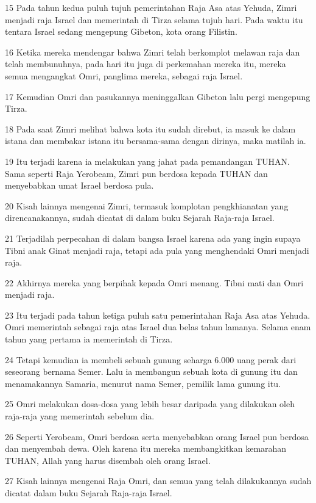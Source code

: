\par 15 Pada tahun kedua puluh tujuh pemerintahan Raja Asa atas Yehuda, Zimri menjadi raja Israel dan memerintah di Tirza selama tujuh hari. Pada waktu itu tentara Israel sedang mengepung Gibeton, kota orang Filistin.
\par 16 Ketika mereka mendengar bahwa Zimri telah berkomplot melawan raja dan telah membunuhnya, pada hari itu juga di perkemahan mereka itu, mereka semua mengangkat Omri, panglima mereka, sebagai raja Israel.
\par 17 Kemudian Omri dan pasukannya meninggalkan Gibeton lalu pergi mengepung Tirza.
\par 18 Pada saat Zimri melihat bahwa kota itu sudah direbut, ia masuk ke dalam istana dan membakar istana itu bersama-sama dengan dirinya, maka matilah ia.
\par 19 Itu terjadi karena ia melakukan yang jahat pada pemandangan TUHAN. Sama seperti Raja Yerobeam, Zimri pun berdosa kepada TUHAN dan menyebabkan umat Israel berdosa pula.
\par 20 Kisah lainnya mengenai Zimri, termasuk komplotan pengkhianatan yang direncanakannya, sudah dicatat di dalam buku Sejarah Raja-raja Israel.
\par 21 Terjadilah perpecahan di dalam bangsa Israel karena ada yang ingin supaya Tibni anak Ginat menjadi raja, tetapi ada pula yang menghendaki Omri menjadi raja.
\par 22 Akhirnya mereka yang berpihak kepada Omri menang. Tibni mati dan Omri menjadi raja.
\par 23 Itu terjadi pada tahun ketiga puluh satu pemerintahan Raja Asa atas Yehuda. Omri memerintah sebagai raja atas Israel dua belas tahun lamanya. Selama enam tahun yang pertama ia memerintah di Tirza.
\par 24 Tetapi kemudian ia membeli sebuah gunung seharga 6.000 uang perak dari seseorang bernama Semer. Lalu ia membangun sebuah kota di gunung itu dan menamakannya Samaria, menurut nama Semer, pemilik lama gunung itu.
\par 25 Omri melakukan dosa-dosa yang lebih besar daripada yang dilakukan oleh raja-raja yang memerintah sebelum dia.
\par 26 Seperti Yerobeam, Omri berdosa serta menyebabkan orang Israel pun berdosa dan menyembah dewa. Oleh karena itu mereka membangkitkan kemarahan TUHAN, Allah yang harus disembah oleh orang Israel.
\par 27 Kisah lainnya mengenai Raja Omri, dan semua yang telah dilakukannya sudah dicatat dalam buku Sejarah Raja-raja Israel.
